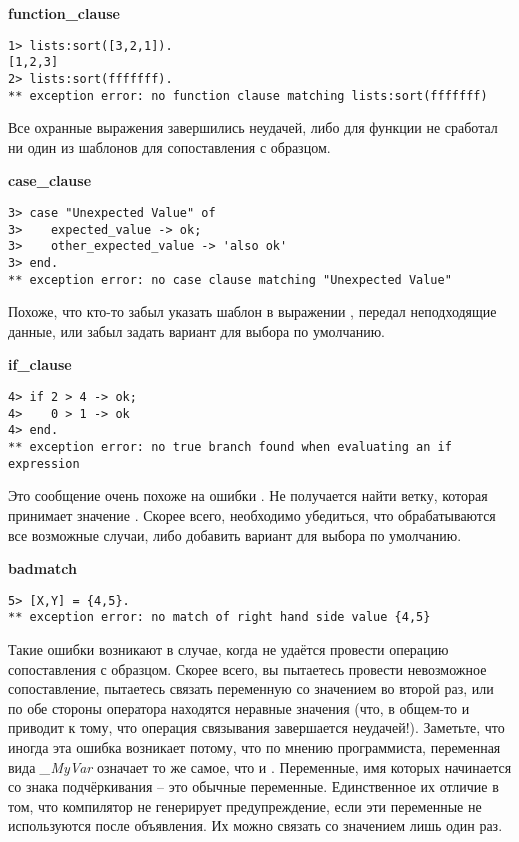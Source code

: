 \textbf{function\_clause}
\begin{lstlisting}[style=erlang]
1> lists:sort([3,2,1]).
[1,2,3]
2> lists:sort(fffffff).
** exception error: no function clause matching lists:sort(fffffff)
\end{lstlisting}

Все охранные выражения завершились неудачей, либо для функции не сработал ни один из шаблонов для сопоставления с образцом.
\blankline

\textbf{case\_clause}
\begin{lstlisting}[style=erlang]
3> case "Unexpected Value" of
3>    expected_value -> ok;
3>    other_expected_value -> 'also ok'
3> end.
** exception error: no case clause matching "Unexpected Value"
\end{lstlisting}

Похоже, что кто\--то забыл указать шаблон в выражении , передал неподходящие данные, или забыл задать вариант для выбора по умолчанию.
\blankline

\textbf{if\_clause}
\begin{lstlisting}[style=erlang]
4> if 2 > 4 -> ok;
4>    0 > 1 -> ok
4> end.
** exception error: no true branch found when evaluating an if expression
\end{lstlisting}

Это сообщение очень похоже на ошибки . Не получается найти ветку, которая принимает значение .
Скорее всего, необходимо убедиться, что обрабатываются все возможные случаи, либо добавить вариант  для выбора по умолчанию.
\blankline

\textbf{badmatch}
\begin{lstlisting}[style=erlang]
5> [X,Y] = {4,5}.
** exception error: no match of right hand side value {4,5}
\end{lstlisting}

Такие ошибки возникают в случае, когда не удаётся провести операцию сопоставления с образцом.
Скорее всего, вы пытаетесь провести невозможное сопоставление, пытаетесь связать переменную со значением во второй раз, или по обе стороны оператора \ops{\strut=} находятся неравные значения (что, в общем\--то и приводит к тому, что операция связывания завершается неудачей!).
Заметьте, что иногда эта ошибка возникает потому, что по мнению программиста, переменная вида \emph{\_MyVar} означает то же самое, что и \ops{\strut\_}.
Переменные, имя которых начинается со знака подчёркивания \--- это обычные переменные.
Единственное их отличие в том, что компилятор не генерирует предупреждение, если эти переменные не используются после объявления.
Их можно связать со значением лишь один раз.
\blankline

